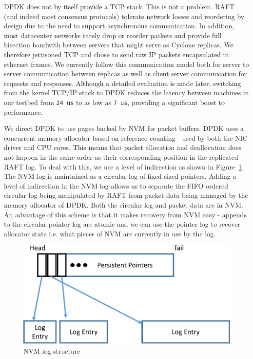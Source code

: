 \documentclass[pageno]{jpaper}
\begin{document}
DPDK does not by itself provide a TCP stack. This is not a problem. RAFT (and
indeed most consensus protocols) tolerate network losses and reordering by
design due to the need to support asynchronous communication. In addition, most
datacenter networks rarely drop or reorder packets and provide full bisection
bandwith between servers that might serve as Cyclone replicas. We therefore
jettisoned TCP and chose to send raw IP packets encapsulated in ethernet
frames. We currently follow this communication model both for server to server
communication between replicas as well as client server communication for
requests and responses. Although a detailed evaluation is made later, switching
from the kernel TCP/IP stack to DPDK reduces the latency between machines in our
testbed from {\tt 24 us} to as low as {\tt 7 us}, providing a significant boost
to performance.

We direct DPDK to use pages backed by NVM for packet buffers. DPDK uses a
concurrent memory allocator based on reference counting - used by both the NIC
driver and CPU cores. This means that packet allocation and deallocation does
not happen in the same order as their corresponding position in the replicated
RAFT log. To deal with this, we use a level of indirection as shown in
Figure~\ref{fig:nvm_log}. The NVM log is maintained as a circular log of fixed
sized pointers. Adding a level of indirection in the NVM log allows us to
separate the FIFO ordered circular log being manipulated by RAFT from packet
data being managed by the memory allocator of DPDK. Both the circular log and
packet data are in NVM. An advantage of this scheme is that it makes recovery
from NVM easy - appends to the circular pointer log are atomic and we can use
the pointer log to recover allocator state i.e. what pieces of NVM are currently
in use by the log.

\begin{figure}
\centering
\includegraphics[scale=0.3]{figures2/nvm_log.pdf}
\caption{NVM log structure}
\label{fig:nvm_log}
\end{figure}
\end{document}
